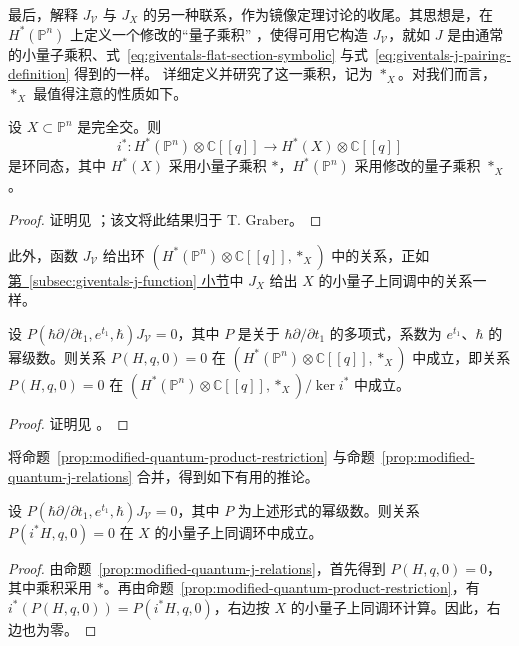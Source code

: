 最后，解释 $J_{\mathcal V}$ 与 $J_X$ 的另一种联系，作为镜像定理讨论的收尾。其思想是，在 $H^*(\mathbb P^n)$ 上定义一个修改的“量子乘积” ，使得可用它构造 $J_{\mathcal V}$，就如 $J$ 是由通常的小量子乘积、式~\eqref{eq:giventals-flat-section-symbolic} 与式~\eqref{eq:giventals-j-pairing-definition} 得到的一样。 详细定义并研究了这一乘积，记为 $*_X$。对我们而言，$*_X$ 最值得注意的性质如下。
\begin{proposition}\label{prop:modified-quantum-product-restriction}
设 $X\subset\mathbb P^n$ 是完全交。则
\[
i^*:H^*(\mathbb P^n)\otimes\mathbb C[[q]]\longrightarrow H^*(X)\otimes\mathbb C[[q]]
\]
是环同态，其中 $H^*(X)$ 采用小量子乘积 $*$，$H^*(\mathbb P^n)$ 采用修改的量子乘积 $*_X$。
\end{proposition}
\begin{proof}
证明见 ；该文将此结果归于 T. Graber。
\end{proof}
此外，函数 $J_{\mathcal V}$ 给出环 $(H^*(\mathbb P^n)\otimes\mathbb C[[q]],*_X)$ 中的关系，正如\hyperref[subsec:giventals-j-function]{第~\ref*{subsec:giventals-j-function} 小节}中 $J_X$ 给出 $X$ 的小量子上同调中的关系一样。
\begin{proposition}\label{prop:modified-quantum-j-relations}
设 $P(\hbar\partial/\partial t_1,e^{t_1},\hbar)J_{\mathcal V}=0$，其中 $P$ 是关于 $\hbar\partial/\partial t_1$ 的多项式，系数为 $e^{t_1}$、$\hbar$ 的幂级数。则关系 $P(H,q,0)=0$ 在 $(H^*(\mathbb P^n)\otimes\mathbb C[[q]],*_X)$ 中成立，即关系 $P(H,q,0)=0$ 在 $(H^*(\mathbb P^n)\otimes\mathbb C[[q]],*_X)/\ker i^*$ 中成立。
\end{proposition}
\begin{proof}
证明见 。
\end{proof}
将命题~\ref{prop:modified-quantum-product-restriction} 与命题~\ref{prop:modified-quantum-j-relations} 合并，得到如下有用的推论。
\begin{corollary}\label{cor:complete-intersection-j-quantum-relations}
设 $P(\hbar\partial/\partial t_1,e^{t_1},\hbar)J_{\mathcal V}=0$，其中 $P$ 为上述形式的幂级数。则关系 $P(i^*H,q,0)=0$ 在 $X$ 的小量子上同调环中成立。
\end{corollary}
\begin{proof}
由命题~\ref{prop:modified-quantum-j-relations}，首先得到 $P(H,q,0)=0$，其中乘积采用 $*$。再由命题~\ref{prop:modified-quantum-product-restriction}，有 $i^*(P(H,q,0))=P(i^*H,q,0)$，右边按 $X$ 的小量子上同调环计算。因此，右边也为零。
\end{proof}

